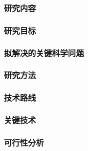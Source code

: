 \justifying
\NSFCBodyText

\subsubsection{研究内容}

\subsubsection{研究目标}

\subsubsection{拟解决的关键科学问题}

\subsubsection{研究方法}

\subsubsection{技术路线}

\subsubsection{关键技术}

\subsubsection{可行性分析}
